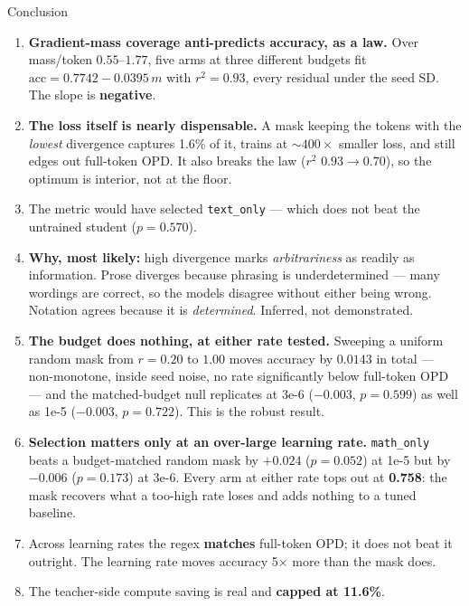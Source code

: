 \documentclass[aspectratio=169,11pt]{beamer}
\newcommand{\dn}[1]{\textcolor{bad}{\textbf{#1}}}
\newcommand{\aside}[1]{{\footnotesize\textcolor{mut}{#1}}}
\begin{document}
\begin{frame}{Conclusion}

\begin{enumerate}
  \item \textbf{Gradient-mass coverage anti-predicts accuracy, as a law.} Over
        mass/token $0.55$--$1.77$, five arms at three different budgets fit
        $\text{acc}=0.7742-0.0395\,m$ with $r^2=0.93$, every residual under the seed SD.
        The slope is \dn{negative}.
  \item \textbf{The loss itself is nearly dispensable.} A mask keeping the tokens with the
        \emph{lowest} divergence captures 1.6\% of it, trains at ${\sim}400\times$ smaller loss,
        and still edges out full-token OPD. It also breaks the law ($r^2$ $0.93\to0.70$), so the
        optimum is interior, not at the floor.
  \item The metric would have selected \texttt{text\_only} --- which does not beat the
        untrained student ($p=0.570$).
  \item \textbf{Why, most likely:} high divergence marks \emph{arbitrariness} as readily as
        information. Prose diverges because phrasing is underdetermined --- many wordings are
        correct, so the models disagree without either being wrong. Notation agrees because it
        is \emph{determined}. \aside{Inferred, not demonstrated.}
  \item \textbf{The budget does nothing, at either rate tested.} Sweeping a uniform random
        mask from $r=0.20$ to $1.00$ moves accuracy by $0.0143$ in total --- non-monotone,
        inside seed noise, no rate significantly below full-token OPD --- and the matched-budget
        null replicates at 3e-6 ($-0.003$, $p=0.599$) as well as 1e-5 ($-0.003$, $p=0.722$).
        This is the robust result.
  \item \textbf{Selection matters only at an over-large learning rate.} \texttt{math\_only}
        beats a budget-matched random mask by $+0.024$ ($p=0.052$) at 1e-5 but by $-0.006$
        ($p=0.173$) at 3e-6. Every arm at either rate tops out at \textbf{0.758}: the mask
        recovers what a too-high rate loses and adds nothing to a tuned baseline.
  \item Across learning rates the regex \textbf{matches} full-token OPD; it does not beat it
        outright. The learning rate moves accuracy 5$\times$ more than the mask does.
  \item The teacher-side compute saving is real and \textbf{capped at 11.6\%}.
\end{enumerate}


\end{frame}
\end{document}
